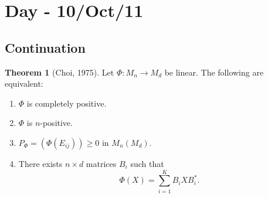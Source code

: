 \documentclass[12pt]{article}
\theoremstyle{definition}
\newtheorem*{theorem}{Theorem}
\begin{document}
\section{Day - 10/Oct/11}

\subsection{Continuation}

\begin{theorem}[Choi, 1975]
Let $\Phi:M_n \to M_d$ be linear. The following are equivalent:
\begin{enumerate}
\item $\Phi$ is completely positive.
\item $\Phi$ is $n$-positive.
\item $P_\Phi = (\Phi(E_{ij})) \geq 0$ in $M_n(M_d)$.
\item There exists $n \times d$ matrices $B_i$ such that
\[
\Phi(X) = \sum_{i=1}^K B_iXB_i^*.
\]
\end{enumerate}
\end{theorem}
\end{document}
